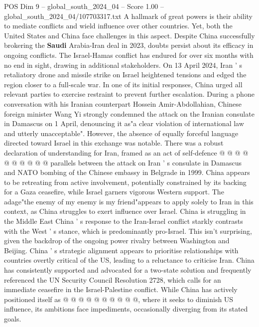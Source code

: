 \begin{textsample}{POS Dim 9 – global\_south\_2024\_04 – Score 1.00 – global\_south\_2024\_04/107703317.txt}  \label{ex:f9_pos_122}
A hallmark of great powers is their ability to mediate conflicts and wield influence over other countries.
Yet, both the United States and China face challenges in this aspect.
Despite China successfully brokering the \textbf{Saudi} Arabia-Iran deal in 2023, doubts persist about its efficacy in ongoing conflicts.
The Israel-Hamas conflict has endured for over six months with no end in sight, drawing in additional stakeholders.
On 13 April 2024, Iran ' s retaliatory drone and missile strike on Israel heightened tensions and edged the region closer to a full-scale war.
In one of its initial responses, China urged all relevant parties to exercise restraint to prevent further escalation.
During a phone conversation with his Iranian counterpart Hossein Amir-Abdollahian, Chinese foreign minister Wang Yi strongly condemned the attack on the Iranian consulate in Damascus on 1 April, denouncing it as"a clear violation of international law and utterly unacceptable".
However, the absence of equally forceful language directed toward Israel in this exchange was notable.
There was a robust declaration of understanding for Iran, framed as an act of self-defence @ @ @ @ @ @ @ @ @ @ parallels between the attack on Iran ' s consulate in Damascus and NATO bombing of the Chinese embassy in Belgrade in 1999.
China appears to be retreating from active involvement, potentially constrained by its backing for a Gaza ceasefire, while Israel garners vigorous Western support.
The adage"the enemy of my enemy is my friend"appears to apply solely to Iran in this context, as China struggles to exert influence over Israel.
China is struggling in the Middle East China ' s response to the Iran-Israel conflict starkly contrasts with the West ' s stance, which is predominantly pro-Israel.
This isn't surprising, given the backdrop of the ongoing power rivalry between Washington and Beijing.
China ' s strategic alignment appears to prioritise relationships with countries overtly critical of the US, leading to a reluctance to criticise Iran.
China has consistently supported and advocated for a two-state solution and frequently referenced the UN Security Council Resolution 2728, which calls for an immediate ceasefire in the Israel-Palestine conflict.
While China has actively positioned itself as @ @ @ @ @ @ @ @ @ @, where it seeks to diminish US influence, its ambitions face impediments, occasionally diverging from its stated goals.

\end{textsample}
